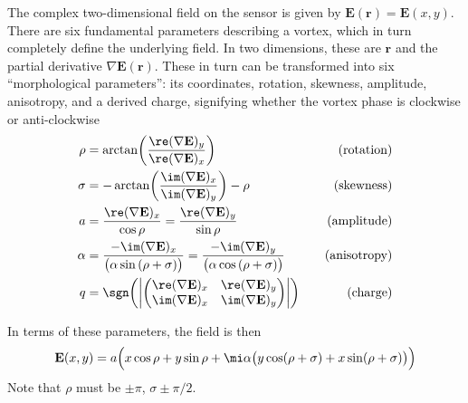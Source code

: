 The complex two-dimensional field on the sensor is given by
$\mathbf{E}(\mathbf{r}) = \mathbf{E}(x,y)$.
There are six fundamental parameters describing a vortex, which in turn
completely define the underlying field.  In two dimensions, these are
$\mathbf{r}$ and the partial derivative $\nabla \mathbf{E}(\mathbf{r})$.
These in turn can be transformed into six ``morphological parameters'': its
coordinates, rotation, skewness, amplitude, anisotropy, and a derived
charge, signifying whether the vortex phase is clockwise or anti-clockwise
\begingroup
\newcommand{\rx}{\re(\nabla\mathbf{E})_x}
\newcommand{\ry}{\re(\nabla\mathbf{E})_y}
\newcommand{\ix}{\im(\nabla\mathbf{E})_x}
\newcommand{\iy}{\im(\nabla\mathbf{E})_y}
\begin{align}
  \rho                                                                 & = \arctan\!\left(\frac{\ry}{\rx}\right) \quad                  & \text{(rotation)}  \\
  \sigma                                                               & = -\arctan\!\left(\frac{\ix}{\iy}\right)-\rho \quad            & \text{(skewness)}  \\
  a                                                                    & = \frac{\rx}{\cos\rho} = \frac{\ry}{\sin\rho} \quad            & \text{(amplitude)} \\
  \alpha                                                               & = \frac{-\ix}{\bigl(\alpha \sin\left(\rho+\sigma\right)\bigr)}
  = \frac{-\iy}{\bigl(\alpha \cos\left(\rho+\sigma\right)\bigr)} \quad & \text{(anisotropy)}                                                                 \\
  q                                                                    & = \sgn\!\left( \left|
  \begin{pmatrix}
      \rx & \ry \\
      \ix & \iy
    \end{pmatrix}
  \right|\right) \quad                                                 & \text{(charge)}
\end{align}
\endgroup

In terms of these parameters, the field is then
\begin{equation}
  \mathbf{E}(x,y) = a \Bigl( x \cos\rho + y \sin \rho
  + \mi \alpha \bigr(y \cos(\rho + \sigma) + x \sin(\rho+\sigma)\bigr)\Bigr)
\end{equation}
Note that $\rho$ must be $\pm\pi$, $\sigma \pm \pi/2$.

